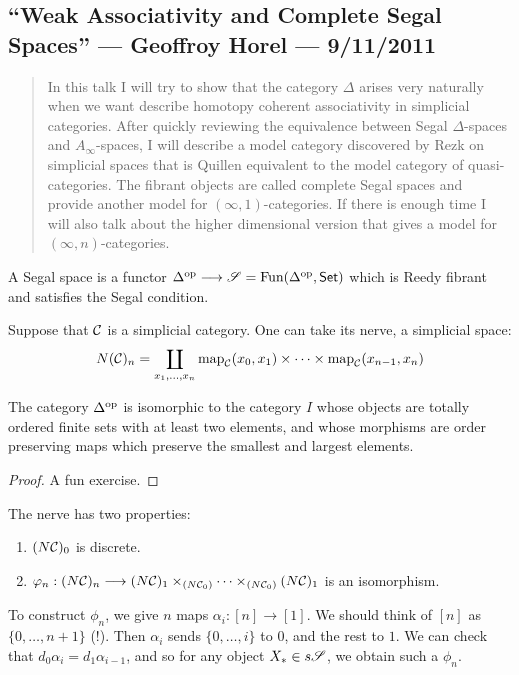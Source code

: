 \documentclass[11pt]{article}
\newcommand{\KanSemResponse}[1]
{
\thispagestyle{fancy}
\subsection*{#1}
}
\begin{document}
\begin{GeoffroyWeakAssociativityandCompleteSegalSpaces}
\KanSemResponse
{``Weak Associativity and Complete Segal Spaces'' --- Geoffroy Horel --- 9/11/2011}
\begin{abstract}
In this talk I will try to show that the category $\Delta$ arises very 
naturally when we want describe homotopy coherent associativity in 
simplicial categories. After quickly reviewing the equivalence between 
Segal $\Delta$-spaces and $A_\infty$-spaces, I will describe a model 
category discovered by Rezk on simplicial spaces that is Quillen 
equivalent to the model category of quasi-categories. The fibrant 
objects are called complete Segal spaces and provide another model for 
$(\infty, 1)$-categories. If there is enough time I will also talk 
about the higher dimensional version that gives a model for $(\infty, 
n)$-categories.
\end{abstract}
\begin{defn*}
A Segal space is a functor $\Delta^{\textup{op}}\longrightarrow\mathscr{S}=\textup{Fun}(\Delta^{\textup{op}},\mathsf{Set})$ which is Reedy fibrant and satisfies the Segal condition.
\end{defn*}
\begin{exmp*}
Suppose that $\mathcal{C}$ is a simplicial category. One can take its nerve, a simplicial space:
\[N(\mathcal{C})_n=\coprod_{x_1,\ldots, x_n}\textup{map}_{\mathcal{C}}(x_0,x_1)\times\cdots\times\textup{map}_{\mathcal{C}}(x_{n-1},x_n)\]
\end{exmp*}
\begin{lem*}
The category $\Delta^{\textup{op}}$ is isomorphic to the category $I$ whose objects are totally ordered finite sets with at least two elements, and whose morphisms are order preserving maps which preserve the smallest and largest elements.
\end{lem*}
\begin{proof}
A fun exercise.
\end{proof}
The nerve has two properties:
\begin{enumerate}\squishlist
\item $(N\mathcal{C})_0$ is discrete.
\item $\varphi_n:(N\mathcal{C})_n\longrightarrow(N\mathcal{C})_1\times_{(N\mathcal{C}_0)}\cdots\times_{(N\mathcal{C}_0)}(N\mathcal{C})_1$ is an isomorphism.
\end{enumerate}
To construct $\phi_n$, we give $n$ maps $\alpha_i:[n]\to[1]$.  We should think of $[n]$ as $\{0,\ldots,n+1\}$ (!). Then $\alpha_i$ sends $\{0,\ldots,i\}$ to $0$, and the rest to $1$. We can check that $d_0\alpha_i=d_1\alpha_{i-1}$, and so for any object $X_*\in s\mathscr{S}$, we obtain such a $\phi_n$.


\end{GeoffroyWeakAssociativityandCompleteSegalSpaces}
\end{document}
